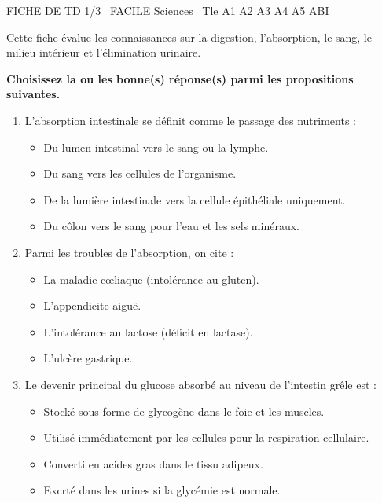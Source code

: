 \documentclass[11pt]{article}
\begin{document}
\begin{tcolorbox}[enhanced,colback=popink,colframe=popink,arc=10pt,boxrule=0pt,left=12pt,right=12pt,top=9pt,bottom=9pt]
{\color{white}\popxbold\small FICHE DE TD 1/3 \textbullet\ FACILE \hfill Sciences \textbullet\ Tle A1 A2 A3 A4 A5 ABI\par}
\end{tcolorbox}
\vspace{4pt}
Cette fiche évalue les connaissances sur la digestion, l'absorption, le sang, le milieu intérieur et l'élimination urinaire.

\begin{exercice}
\textbf{Choisissez la ou les bonne(s) réponse(s) parmi les propositions suivantes.}
\begin{enumerate}
    \item L'absorption intestinale se définit comme le passage des nutriments :
    \begin{itemize}
        \item[A.] Du lumen intestinal vers le sang ou la lymphe.
        \item[B.] Du sang vers les cellules de l'organisme.
        \item[C.] De la lumière intestinale vers la cellule épithéliale uniquement.
        \item[D.] Du côlon vers le sang pour l'eau et les sels minéraux.
    \end{itemize}
    \item Parmi les troubles de l'absorption, on cite :
    \begin{itemize}
        \item[A.] La maladie cœliaque (intolérance au gluten).
        \item[B.] L'appendicite aiguë.
        \item[C.] L'intolérance au lactose (déficit en lactase).
        \item[D.] L'ulcère gastrique.
    \end{itemize}
    \item Le devenir principal du glucose absorbé au niveau de l'intestin grêle est :
    \begin{itemize}
        \item[A.] Stocké sous forme de glycogène dans le foie et les muscles.
        \item[B.] Utilisé immédiatement par les cellules pour la respiration cellulaire.
        \item[C.] Converti en acides gras dans le tissu adipeux.
        \item[D.] Excrté dans les urines si la glycémie est normale.
    \end{itemize}
\end{enumerate}
\end{exercice}
\end{document}
